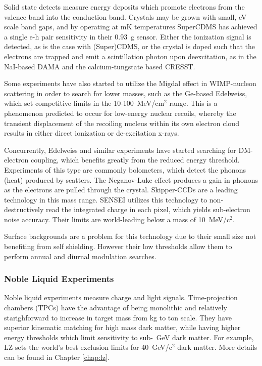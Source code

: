 Solid state detects measure energy deposits which promote electrons from the valence band into the conduction band.
Crystals may be grown with small, eV scale band gaps, and by operating at mK temperatures SuperCDMS has achieved a single e-h pair sensitivity in their 0.93~g sensor\cite{supercdms_collaboration_constraints_2020}.
Either the ionization signal is detected, as is the case with (Super)CDMS, or the crystal is doped such that the electrons are trapped and emit a scintillation photon upon deexcitation, as in the NaI-based DAMA\cite{bernabei_dark_2021} and the calcium-tungstate based CRESST\cite{angloher_results_2016}.

Some experiments have also started to utilize the Migdal effect in WIMP-nucleon scattering in order to search for lower masses, such as the Ge-based Edelweiss\cite{edelweiss_collaboration_search_2022}, which set competitive limits in the 10-100~MeV/cm$^2$ range.
This is a phenomenon predicted to occur for low-energy nuclear recoils, whereby the transient displacement of the recoiling nucleus within its own electron cloud results in either direct ionization or de-excitation x-rays\cite{ibe_migdal_2018}.

Concurrently, Edelweiss and similar experiments have started searching for DM-electron coupling\cite{gascon_low-mass_2022}, which benefits greatly from the reduced energy threshold.
Experiments of this type are commonly bolometers, which detect the phonons (heat) produced by scatters.
The Neganov-Luke effect produces a gain in phonons as the electrons are pulled through the crystal.
Skipper-CCDs are a leading technology in this mass range. 
SENSEI\cite{barak_sensei_2020} utilizes this technology to non-destructively read the integrated charge in each pixel, which yields sub-electron noise accuracy.
Their limits are world-leading below a mass of 10~MeV/c$^2$.

Surface backgrounds are a problem for this technology due to their small size not benefiting from self shielding.
However their low thresholds allow them to perform annual and diurnal modulation searches.

\subsubsection{Noble Liquid Experiments}

Noble liquid experiments measure  charge and light signals.
Time-projection chambers (TPCs) have the advantage of being monolithic and relatively starighforward to increase in target mass from kg to ton scale.
They have superior kinematic matching for high mass dark matter, while having higher energy thresholds which limit sensitivity to sub-~GeV dark matter.
For example, LZ sets the world's best exclusion limits for 40~GeV/c$^2$ dark matter\cite{aalbers_first_2022}.
More details can be found in Chapter \ref{chap:lz}.

